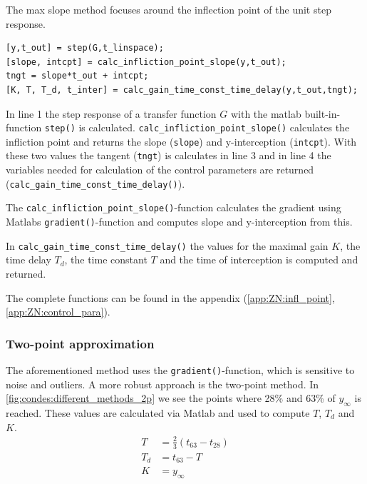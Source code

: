 The max slope method focuses around the inflection point of the unit step response.

\begin{lstlisting}[style=Matlab-editor,caption={This code snippet show the general way of calculating the control parameters with the max slope method.},captionpos=b,label={list:condes:maxS}]
[y,t_out] = step(G,t_linspace);
[slope, intcpt] = calc_infliction_point_slope(y,t_out);
tngt = slope*t_out + intcpt;
[K, T, T_d, t_inter] = calc_gain_time_const_time_delay(y,t_out,tngt);
\end{lstlisting}

In line 1 the step response of a transfer function $G$ with the matlab built-in-function \texttt{step()} is calculated.
\texttt{calc\_infliction\_point\_slope()} calculates the infliction point and returns the slope (\texttt{slope}) and y-interception (\texttt{intcpt}).
With these two values the tangent (\texttt{tngt}) is calculates in line 3 and in line 4 the variables needed for calculation of the control parameters are returned (\texttt{calc\_gain\_time\_const\_time\_delay()}).

The \texttt{calc\_infliction\_point\_slope()}-function calculates the gradient using Matlabs \texttt{gradient()}-function and computes slope and y-interception from this.

In \texttt{calc\_gain\_time\_const\_time\_delay()} the values for the maximal gain $K$, the time delay $T_d$, the time constant $T$ and the time of interception is computed and returned.

The complete functions can be found in the appendix (\autoref{app:ZN:infl_point}, \autoref{app:ZN:control_para}).

\subsubsection{Two-point approximation} \label{sec:condes:ZN:2p}

The aforementioned method uses the \texttt{gradient()}-function, which is sensitive to noise and outliers.
A more robust approach is the two-point method.
In \autoref{fig:condes:different_methods_2p} we see the points where 28\% and 63\% of $y_{\infty}$ is reached.
These values are calculated via Matlab and used to compute $T$, $T_d$ and $K$.
\begin{align}
    T &= \frac{2}{3} \left( t_{63} - t_{28} \right) \\
    T_d &= t_{63} - T \\
    K &= y_{\infty}
\end{align}




